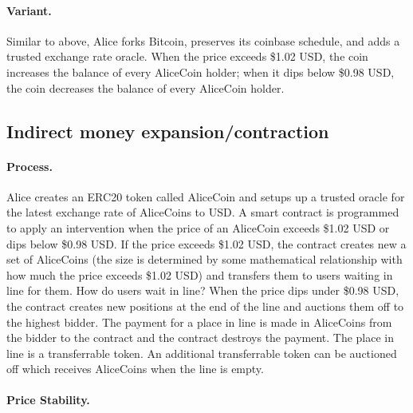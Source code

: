 \paragraph{Variant.} Similar to above, Alice forks Bitcoin, preserves its coinbase schedule, and adds a trusted exchange rate oracle. When the price exceeds \$1.02 USD, the coin increases the balance of every AliceCoin holder; when it dips below \$0.98 USD, the coin decreases the balance of every AliceCoin holder.



\subsection{Indirect money expansion/contraction}

\paragraph{Process.} Alice creates an ERC20 token called AliceCoin and setups up a trusted oracle for the latest exchange rate of AliceCoins to USD. A smart contract is programmed to apply an intervention when the price of an AliceCoin exceeds \$1.02 USD or dips below \$0.98 USD.  If the price exceeds \$1.02 USD, the contract creates new a set of AliceCoins (the size is determined by some mathematical relationship with how much the price exceeds \$1.02 USD) and transfers them to users waiting in line for them. How do users wait in line? When the price dips under \$0.98 USD, the contract creates new positions at the end of the line and auctions them off to the highest bidder. The payment for a place in line is made in AliceCoins from the bidder to the contract and the contract destroys the payment. The place in line is a transferrable token. An additional transferrable token can be auctioned off which receives AliceCoins when the line is empty.


\paragraph{Price Stability.}

